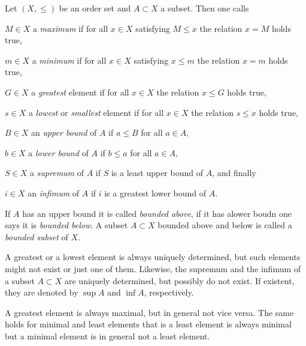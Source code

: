 \begin{definition}
  Let $(X,\leq)$ be an order set and $A\subset X$ a subset. Then one calls
  \begin{romanlist}
  \item $ M\in X$ a \emph{maximum} if for all $x \in X$ satisfying $M \leq x$ the relation $x=M$ holds true,
  \item $ m\in X$ a \emph{minimum} if for all $x \in X$ satisfying $x\leq m$ the relation $x=m$ holds true,
  \item $ G\in X$ a \emph{greatest} element if for all $x \in X$ the relation $x\leq G$ holds true,
  \item $ s\in X$ a \emph{lowest} or \emph{smallest} element if for all $x \in X$ the relation $s\leq x$ holds true,
  \item $ B\in X$ an \emph{upper bound} of $A$ if $a \leq B$ for all $a \in A$,
  \item $ b\in X$ a \emph{lower bound} of $A$ if $b \leq a$ for all $a \in A$,
  \item $ S\in X$ a \emph{supremum} of $A$ if $S$ is a least upper bound of $A$, and finally
  \item $ i\in X$ an \emph{infimum} of $A$ if $i$ is a greatest lower bound of $A$.
  \end{romanlist}
  If $A$ has an upper bound it is called \emph{bounded above}, if it has  alower boudn one says it is 
  \emph{bounded below}. A subset $A \subset X$ bounded above and below is called a \emph{bounded subset} of $X$.
\end{definition}

\begin{remarks}
  \begin{letterlist}
  \item  A greatest or a lowest element is always uniquely determined, but such elements might not exist
         or just one of them.  
         Likewise, the supremum and the infimum of a subset $A \subset X$ are uniquely determined,
         but possibly do not exist. 
         If existent, they are denoted by $\sup A$ and $\inf A$, respectively.        
  \item  A greatest element is always maximal, but in general not vice versa. 
         The same holds for minimal and least elements that is a least element is always minimal but 
         a minimal element is in general not a least element. 
  \end{letterlist}
 
\end{remarks}

